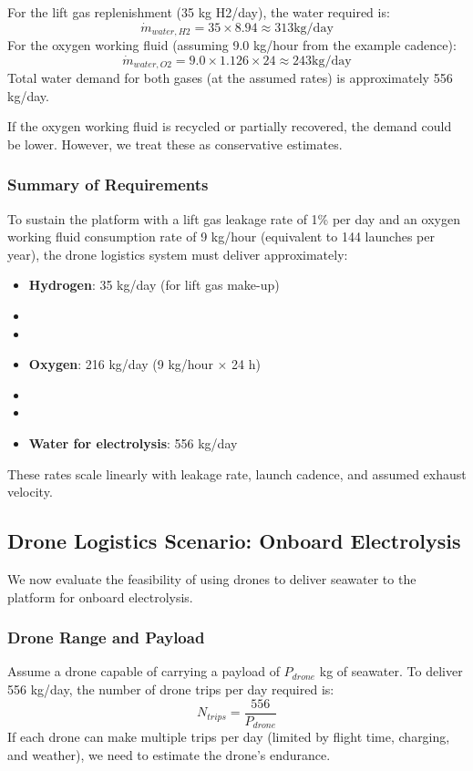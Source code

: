 For the lift gas replenishment (35 kg H2/day), the water required is:
\begin{equation}
\dot{m}_{water,H2} = 35 \times 8.94 \approx 313  \text{kg/day}
\end{equation}
For the oxygen working fluid (assuming 9.0 kg/hour from the example cadence):
\begin{equation}
\dot{m}_{water,O2} = 9.0 \times 1.126 \times 24 \approx 243  \text{kg/day}
\end{equation}
Total water demand for both gases (at the assumed rates) is approximately 556 kg/day.

If the oxygen working fluid is recycled or partially recovered, the demand could be lower. However, we treat these as conservative estimates.

\subsubsection{Summary of Requirements}
To sustain the platform with a lift gas leakage rate of 1\% per day and an oxygen working fluid consumption rate of 9 kg/hour (equivalent to 144 launches per year), the drone logistics system must deliver approximately:
\begin{itemize}
    \item \textbf{Hydrogen}: 35 kg/day (for lift gas make-up)
    \item \item \item \textbf{Oxygen}: 216 kg/day (9 kg/hour $\times$ 24 h)
    \item \item \item \textbf{Water for electrolysis}: 556 kg/day
\end{itemize}
These rates scale linearly with leakage rate, launch cadence, and assumed exhaust velocity.

\subsection{Drone Logistics Scenario: Onboard Electrolysis}
We now evaluate the feasibility of using drones to deliver seawater to the platform for onboard electrolysis.

\subsubsection{Drone Range and Payload}
Assume a drone capable of carrying a payload of $P_{drone}$ kg of seawater. To deliver 556 kg/day, the number of drone trips per day required is:
\begin{equation}
N_{trips} = \frac{556}{P_{drone}}
\end{equation}
If each drone can make multiple trips per day (limited by flight time, charging, and weather), we need to estimate the drone's endurance.


